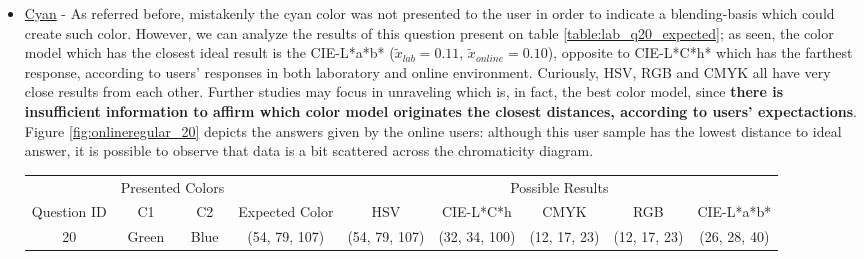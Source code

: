 %
\begin{itemize}
  \item \ul{Cyan} - As referred before, mistakenly the cyan color was not presented to the user in order to indicate a blending-basis which could create such color. However, we can analyze the results of
  this question present on table \ref{table:lab_q20_expected}; as seen, the color model which has the closest ideal result is the CIE-L*a*b* ($\tilde{x}_{lab} = 0.11$, $\tilde{x}_{online} = 0.10$), opposite
  to CIE-L*C*h* which has the farthest response, according to users' responses in both laboratory and online environment. Curiously, HSV, RGB and CMYK all have very close results from each other. Further
  studies may focus in unraveling which is, in fact, the best color model, since \textbf{there is insufficient information to affirm which color model originates the closest distances, according to users'
  expectactions}. Figure \ref{fig:onlineregular_20} depicts the answers given by the online users: although this user sample has the lowest distance to ideal answer, it is possible to observe that data is
  a bit scattered across the chromaticity diagram.
  \begin{table}[H]
    \resizebox{\textwidth}{!} {
    \begin{tabular}{lccccccccccccc}
      \hline
      \multicolumn{1}{c}{}                              & \multicolumn{2}{c}{Presented Colors}             &                                                            & \multicolumn{10}{c}{Possible Results}                                                                                                                                                                                                                                                                       \\ \cline{2-3} \cline{5-14}
      \multicolumn{1}{c}{\multirow{-2}{*}{Question ID}} & C1                   & C2                        & \multirow{-2}{*}{Expected Color}                           & \multicolumn{2}{c}{HSV}                                    & \multicolumn{2}{c}{CIE-L*C*h}                              & \multicolumn{2}{c}{CMYK}                                  & \multicolumn{2}{c}{RGB}                                   & \multicolumn{2}{c}{CIE-L*a*b*}                            \\ \hline
      \multicolumn{1}{c|}{20}                           & Green                & \multicolumn{1}{c|}{Blue} & \multicolumn{1}{c|}{\cellcolor[HTML]{00FFFF}(54, 79, 107)} & \multicolumn{2}{c|}{\cellcolor[HTML]{00FFFF}(54, 79, 107)} & \multicolumn{2}{c|}{\cellcolor[HTML]{00A5FF}(32, 34, 100)} & \multicolumn{2}{c|}{\cellcolor[HTML]{008080}(12, 17, 23)} & \multicolumn{2}{c|}{\cellcolor[HTML]{008080}(12, 17, 23)} & \multicolumn{2}{c|}{\cellcolor[HTML]{7D93A6}(26, 28, 40)} \\ \hline

\end{tabular}}
\end{table}
\end{itemize}

